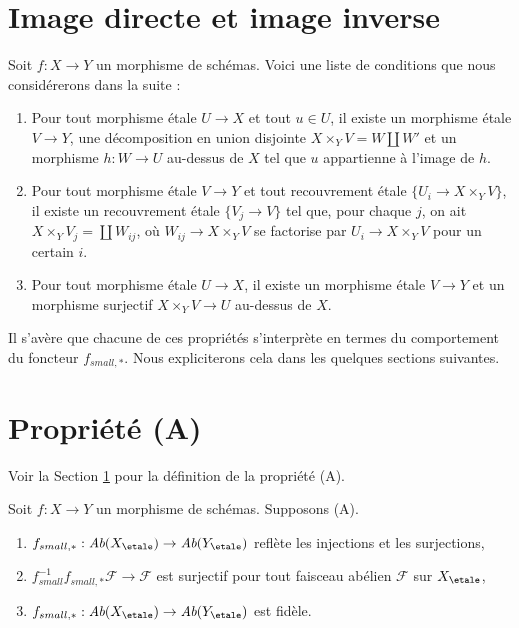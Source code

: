 \section{Image directe et image inverse}
\label{section-monomorphisms}

\noindent
Soit $f : X \to Y$ un morphisme de sch\'emas.
Voici une liste de conditions que nous consid\'ererons dans la suite :
\begin{enumerate}
\item[(A)] Pour tout morphisme \'etale $U \to X$ et tout $u \in U$, il existe
un morphisme \'etale $V \to Y$, une d\'ecomposition en union disjointe
$X \times_Y V = W \amalg W'$ et un morphisme $h : W \to U$ au-dessus de $X$
tel que $u$ appartienne \`a l'image de $h$.
\item[(B)] Pour tout morphisme \'etale $V \to Y$ et tout recouvrement \'etale
$\{U_i \to X \times_Y V\}$, il existe un recouvrement \'etale
$\{V_j \to V\}$ tel que, pour chaque $j$, on ait
$X \times_Y V_j = \coprod W_{ij}$, o\`u $W_{ij} \to X \times_Y V$
se factorise par $U_i \to X \times_Y V$ pour un certain $i$.
\item[(C)] Pour tout morphisme \'etale $U \to X$, il existe un morphisme \'etale $V \to Y$
et un morphisme surjectif $X \times_Y V \to U$ au-dessus de $X$.
\end{enumerate}
Il s'av\`ere que chacune de ces propri\'et\'es s'interpr\`ete en termes du
comportement du foncteur $f_{small, *}$. Nous expliciterons cela
dans les quelques sections suivantes.



\section{Propri\'et\'e (A)}
\label{section-A}

\noindent
Voir la Section \ref{section-monomorphisms} pour la d\'efinition de la propri\'et\'e
(A).

\begin{lemma}
\label{lemma-property-A-implies}
Soit $f : X \to Y$ un morphisme de sch\'emas.
Supposons (A).
\begin{enumerate}
\item
$f_{small, *} :
\textit{Ab}(X_\etale)
\to
\textit{Ab}(Y_\etale)$
refl\`ete les injections et les surjections,
\item $f_{small}^{-1}f_{small, *}\mathcal{F} \to \mathcal{F}$
est surjectif pour tout faisceau ab\'elien $\mathcal{F}$ sur $X_\etale$,
\item
$f_{small, *} :
\textit{Ab}(X_\etale)
\to
\textit{Ab}(Y_\etale)$
est fid\`ele.
\end{enumerate}
\end{lemma}

